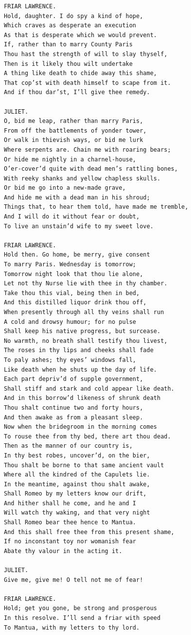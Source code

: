\documentclass{article}
\begin{document}
\begin{verbatim}
FRIAR LAWRENCE.
Hold, daughter. I do spy a kind of hope,
Which craves as desperate an execution
As that is desperate which we would prevent.
If, rather than to marry County Paris
Thou hast the strength of will to slay thyself,
Then is it likely thou wilt undertake
A thing like death to chide away this shame,
That cop’st with death himself to scape from it.
And if thou dar’st, I’ll give thee remedy.

JULIET.
O, bid me leap, rather than marry Paris,
From off the battlements of yonder tower,
Or walk in thievish ways, or bid me lurk
Where serpents are. Chain me with roaring bears;
Or hide me nightly in a charnel-house,
O’er-cover’d quite with dead men’s rattling bones,
With reeky shanks and yellow chapless skulls.
Or bid me go into a new-made grave,
And hide me with a dead man in his shroud;
Things that, to hear them told, have made me tremble,
And I will do it without fear or doubt,
To live an unstain’d wife to my sweet love.

FRIAR LAWRENCE.
Hold then. Go home, be merry, give consent
To marry Paris. Wednesday is tomorrow;
Tomorrow night look that thou lie alone,
Let not thy Nurse lie with thee in thy chamber.
Take thou this vial, being then in bed,
And this distilled liquor drink thou off,
When presently through all thy veins shall run
A cold and drowsy humour; for no pulse
Shall keep his native progress, but surcease.
No warmth, no breath shall testify thou livest,
The roses in thy lips and cheeks shall fade
To paly ashes; thy eyes’ windows fall,
Like death when he shuts up the day of life.
Each part depriv’d of supple government,
Shall stiff and stark and cold appear like death.
And in this borrow’d likeness of shrunk death
Thou shalt continue two and forty hours,
And then awake as from a pleasant sleep.
Now when the bridegroom in the morning comes
To rouse thee from thy bed, there art thou dead.
Then as the manner of our country is,
In thy best robes, uncover’d, on the bier,
Thou shalt be borne to that same ancient vault
Where all the kindred of the Capulets lie.
In the meantime, against thou shalt awake,
Shall Romeo by my letters know our drift,
And hither shall he come, and he and I
Will watch thy waking, and that very night
Shall Romeo bear thee hence to Mantua.
And this shall free thee from this present shame,
If no inconstant toy nor womanish fear
Abate thy valour in the acting it.

JULIET.
Give me, give me! O tell not me of fear!

FRIAR LAWRENCE.
Hold; get you gone, be strong and prosperous
In this resolve. I’ll send a friar with speed
To Mantua, with my letters to thy lord.


\end{verbatim}
\end{document}
